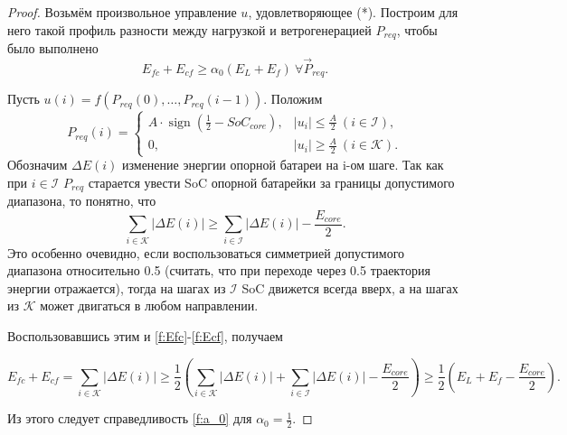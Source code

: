 \documentclass{report}
\def \K {\mathcal{K}}
\def \I {\mathcal{I}}
\DeclareMathOperator{\sign}{sign}
\newcommand{\defeq}{\vcentcolon=}
\begin{document}
\begin{proof}
Возьмём произвольное управление $u$, удовлетворяющее (*).
Построим для него такой профиль разности между нагрузкой и ветрогенерацией $P_{req}$, чтобы было выполнено \begin{equation}
\label{f:a_0}
    E_{fc} + E_{cf} \geq \alpha_0 (E_{L} + E_f) ~\forall \Vec{P}_{req}.
\end{equation}

Пусть $u(i) = f(P_{req}(0), \ldots, P_{req}(i-1))$. 
Положим $$
P_{req}(i) = \begin{cases}
A\cdot \sign(\frac{1}{2} - SoC_{core}), &|u_i| \leq \frac{A}{2}~ (i \in \I),\\
0, &|u_i| \geq \frac{A}{2}~ (i \in \K).
\end{cases}
$$
Обозначим $\Delta E(i)$ изменение энергии опорной батареи на i-ом шаге.
Так как при $i \in \I$ $P_{req}$ старается увести SoC опорной батарейки за границы допустимого диапазона, то понятно, что
$$\sum_{i \in \K}{|\Delta E(i)|} \geq \sum_{i \in \I}{|\Delta E(i)|} -\frac{E_{core}}{2} .$$
Это особенно очевидно, если воспользоваться симметрией допустимого диапазона относительно 0.5 (считать, что при переходе через 0.5 траектория энергии отражается), тогда на шагах из $\I$ SoC движется всегда вверх, а на шагах из $\K$ может двигаться в любом направлении.

Воспользовавшись этим и \ref{f:Efc}-\ref{f:Ecf}, получаем

$$
E_{fc} + E_{cf} %
= \sum_{i \in \K}{|\Delta E(i)|} \geq 
\frac{1}{2} \left(\sum_{i \in \K}{|\Delta E(i)|} + \sum_{i \in \I}{|\Delta E(i)|} -  \frac{E_{core}}{2} \right) \geq
\frac{1}{2} \left(E_{L} + E_f - \frac{E_{core}}{2}\right).
$$





Из этого следует справедливость \ref{f:a_0} для $\alpha_0 = \frac{1}{2}$.

\end{proof}
\end{document}
